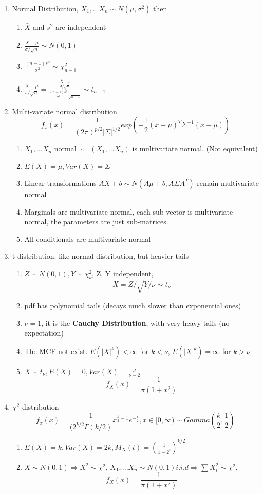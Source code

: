 \documentclass[11pt, openany]{book}              %
\begin{document}
\begin{enumerate}
	\item Normal Distribution, $X_1,...X_n \sim N(\mu,\sigma^2)$ then
	\begin{enumerate}
		\item  $\bar{X}$ and $s^2$ are independent
		\item  $\frac{\bar{X}-\mu}{\sigma/\sqrt{n}} \sim N(0,1)$
		\item  $\frac{(n-1)s^2}{\sigma^2} \sim \chi_{n-1}^2$
		\item  $\frac{\bar{X}-\mu }{s/\sqrt{n}} = \frac{\frac{\bar{X}-\mu}{\sigma/\sqrt{n}}}{\frac{(n-1)s^2}{\sigma^2} \frac{1}{\sqrt{n-1}}} \sim t_{n-1}$
	\end{enumerate}
	\item Multi-variate normal distribution
	$$ f_x(x) = \frac{1}{(2\pi)^{p/2}|\Sigma|^{1/2}}exp(-\frac{1}{2}(x-\mu)^T\Sigma^{-1}(x-\mu))$$
	\begin{enumerate}
		\item $X_1,...X_n$ normal $\Leftarrow (X_1,...X_n)$ is multivariate normal. (Not equivalent)
		\item $E(X)=\mu, Var(X) = \Sigma$
		\item Linear transformations $AX+b \sim N(A\mu+b, A\Sigma A^T)$ remain multivariate normal
		\item Marginals are multivariate normal, each sub-vector is multivariate normal, the parameters are just sub-matrices.
		\item All conditionals are multivariate normal 
	\end{enumerate}
	\item t-distribution: like normal distribution, but heavier tails
	\begin{enumerate}
		\item $Z \sim N(0,1), Y \sim \chi^2_{\nu}$, Z, Y independent, $$ X= Z/\sqrt{Y/\nu} \sim t_{\nu} $$
		\item pdf has polynomial tails (decays much slower than exponential ones)
		\item $\nu=1$, it is the \textbf{Cauchy Distribution}, with very heavy tails (no expectation)
		\item The MCF not exist. $E(|X|^k) < \infty$ for $k<\nu$, $E(|X|^k) = \infty$ for $k>\nu$
		\item $X\sim t_\nu, E(X)=0, Var(X)=\frac{\nu}{\nu-2}$
		$$ f_X(x)=\frac{1}{\pi(1+x^2)}$$
	\end{enumerate}
	\item $\chi^2$ distribution
	$$ f_x(x) = \frac{1}{(2^{k/2}\Gamma(k/2)}x^{\frac{k}{2}-1}e^{-\frac{x}{2}}, x\in [0,\infty) \sim Gamma(\frac{k}{2},\frac{1}{2})$$
	\begin{enumerate}
		\item $E(X)=k, Var(X)=2k, M_X(t)= (\frac{1}{1-2^t})^{k/2}$
		\item $X \sim N(0,1) \Rightarrow X^2 \sim \chi^2$, $X_1,...X_n \sim N(0,1) i.i.d \Rightarrow \sum X_i^2 \sim \chi^2$,
		$$ f_X(x)=\frac{1}{\pi(1+x^2)}$$
	\end{enumerate}	
\end{enumerate}
\end{document}
